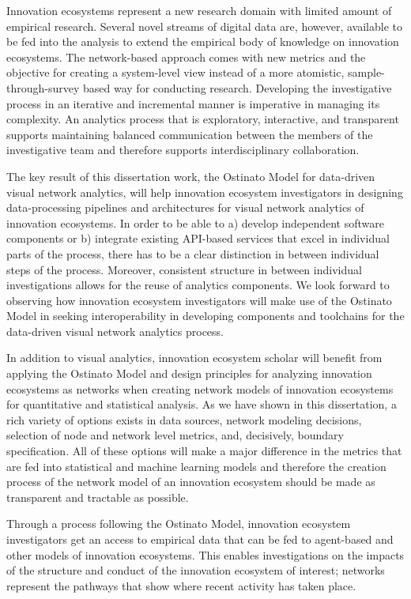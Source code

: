 Innovation ecosystems represent a new research domain with limited amount of empirical research. Several novel streams of digital data are, however, available to be fed into the analysis to extend the empirical body of knowledge on innovation ecosystems. The network-based approach comes with new metrics and the objective for creating a system-level view instead of a more atomistic, sample-through-survey based way for conducting research. Developing the investigative process in an iterative and incremental manner is imperative in managing its complexity. An analytics process that is exploratory, interactive, and transparent supports  maintaining balanced communication between the members of the investigative team and therefore supports interdisciplinary collaboration. 

The key result of this dissertation work, the Ostinato Model for data-driven visual network analytics, will help innovation ecosystem investigators in designing data-processing pipelines and architectures for visual network analytics of innovation ecosystems. In order to be able to a) develop independent software components or b) integrate existing API-based services that excel in individual parts of the process, there has to be a clear distinction in between individual steps of the process. Moreover, consistent structure in between individual investigations allows for the reuse of analytics components. We look forward to observing how innovation ecosystem investigators will make use of the Ostinato Model in seeking interoperability in developing components and toolchains for the data-driven visual network analytics process.

In addition to visual analytics, innovation ecosystem scholar will benefit from applying the Ostinato Model and design principles for analyzing innovation ecosystems as networks when creating network models of innovation ecosystems for quantitative and statistical analysis. As we have shown in this dissertation, a rich variety of options exists in data sources, network modeling decisions, selection of node and network level metrics, and, decisively, boundary specification. All of these options will make a major difference in the metrics that are fed into statistical and machine learning models and therefore the creation process of the network model of an innovation ecosystem should be made as transparent and tractable as possible. 

Through a process following the Ostinato Model, innovation ecosystem investigators get an access to empirical data that can be fed to agent-based and other models of innovation ecosystems. This enables investigations on the impacts of the structure and conduct \citep{Afuah2013, Ahuja2012TheNetworks} of the innovation ecosystem of interest; networks represent the pathways that show where recent activity has taken place.

